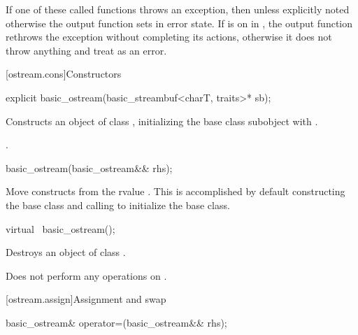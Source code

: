 \pnum
If one of these called functions throws an exception, then unless explicitly noted otherwise
the output function sets
in error state.
If
is on in
,
the output function
rethrows the exception without completing its actions, otherwise
it does not throw anything and treat as an error.

[ostream.cons]{Constructors}

%
\begin{itemdecl}
explicit basic_ostream(basic_streambuf<charT, traits>* sb);
\end{itemdecl}

%
\begin{itemdescr}
\pnum
\effects
Constructs an object of class
, initializing the base class subobject with
.

\pnum
\ensures
{}.
\end{itemdescr}

%
\begin{itemdecl}
basic_ostream(basic_ostream&& rhs);
\end{itemdecl}

\begin{itemdescr}
\pnum
\effects Move constructs from the rvalue .
This is accomplished by default constructing the base class and calling
 to initialize the
base class.
\end{itemdescr}

%
\begin{itemdecl}
virtual ~basic_ostream();
\end{itemdecl}

\begin{itemdescr}
\pnum
\effects
Destroys an object of class
.

\pnum
\remarks
Does not perform any operations on
.
\end{itemdescr}

[ostream.assign]{Assignment and swap}

%
\begin{itemdecl}
basic_ostream& operator=(basic_ostream&& rhs);
\end{itemdecl}


